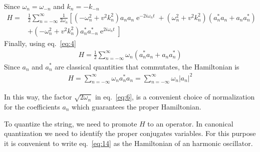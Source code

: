 Since $\omega_n=\omega_{-n}$ and $k_n=-k_{-n}$
\begin{align}
 H =  &\frac12
\sum_{n=-\infty}^\infty \frac{1}{2\omega_n}
  \left[(- \omega_n^2+v^2 k_n^2)a_n a_n \operatorname{e}^{-2i\omega_n t}
+( \omega_n^2+v^2 k_n^2)(a_n^*a_n+a_n a_n^*)\right.\nonumber\\
&+\left.(- \omega_n^2+v^2 k_n^2)a_n^*a_{-n}^*\operatorname{e}^{2i\omega_n t}\right]
\end{align}
Finally, using eq.~\eqref{eq:4}
\begin{align}
\label{eq:13}
  H=\frac{1}{2}\sum_{n=-\infty}^\infty\omega_n(a_n^*a_n+a_n a_n^*)
\end{align}
Since $a_n$ and $a_n^*$ are classical quantities that commutates, the Hamiltonian is
\begin{align}
  \label{eq:14}
  H=\sum_{n=-\infty}^\infty\omega_na_n^*a_n=\sum_{n=-\infty}^\infty\omega_n|a_n|^2
\end{align}

In this way, the factor $\sqrt{2\omega_{n}}$ in eq.~\eqref{eq:6}, is a convenient choice of normalization for the coefficients $a_n$ which guarantees the proper  Hamiltonian.

To quantize the string, we need to promote $H$ to an operator. In canonical quantization we need to identify the proper conjugates variables. For this purpose it is convenient to write eq.~\eqref{eq:14} as the Hamiltonian of an harmonic oscillator.

